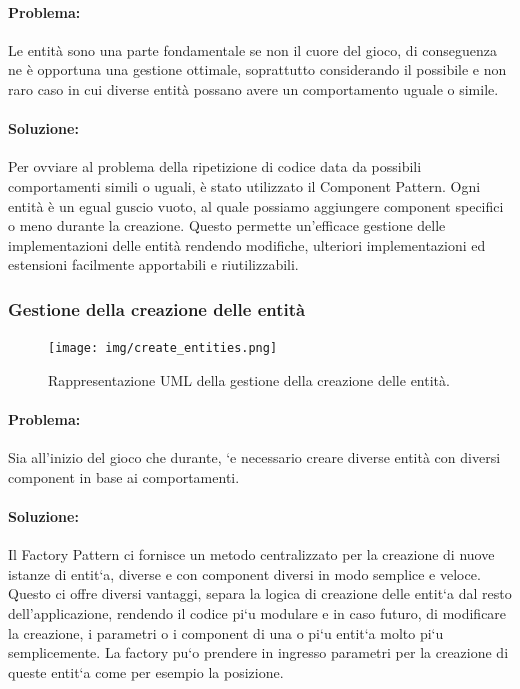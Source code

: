 \documentclass[a4paper,12pt]{report}
\begin{document}
\paragraph{Problema:}
Le entità sono una parte fondamentale se non il cuore del gioco, di conseguenza ne è opportuna una gestione ottimale, soprattutto considerando il possibile e non raro caso in cui diverse entità possano avere un comportamento uguale o simile.

\paragraph{Soluzione:}
Per ovviare al problema della ripetizione di codice data da possibili comportamenti simili o uguali, è stato utilizzato il Component Pattern. Ogni entità è un egual guscio vuoto, al quale possiamo aggiungere component specifici o meno durante la creazione. Questo permette un'efficace gestione delle implementazioni delle entità rendendo modifiche, ulteriori implementazioni ed estensioni facilmente apportabili e riutilizzabili.

\subsubsection{Gestione della creazione delle entità}

\begin{figure}[H]
\centering{}
\texttt{[image: img/create\_entities.png]}
\caption{Rappresentazione UML della gestione della creazione delle entità.}
\end{figure}

\paragraph{Problema:}
Sia all’inizio del gioco che durante, `e necessario creare diverse entità con diversi component in base ai comportamenti.

\paragraph{Soluzione:}
Il Factory Pattern ci fornisce un metodo centralizzato per la creazione di nuove istanze di entit`a, diverse e con component diversi in modo semplice e veloce. Questo ci offre diversi vantaggi, separa la logica di creazione delle entit`a dal resto dell’applicazione, rendendo il codice pi`u modulare e in caso futuro, di modificare la creazione, i parametri o i component di una o pi`u entit`a molto pi`u semplicemente. La factory pu`o prendere in ingresso parametri per la creazione di queste entit`a come per esempio la posizione.
\end{document}
